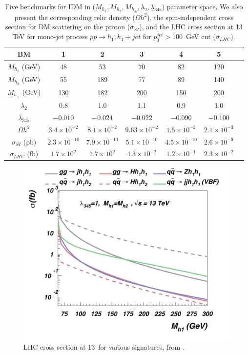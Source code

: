 \begin{table}[htb]
	\centering
	\begin{tabular}{|c||c|c|c|c|c|c|}
		\hline
		{\bf BM}                       &  {\bf 1}  & {\bf 2}  & {\bf 3}  & {\bf 4}  &  {\bf 5}  \\
		\hline\hline 
		$M_{h_{1}}$ (GeV)     & 48      	& 53 		& 70 		& 82 	&120 \\
		\hline
		$M_{h_{2}}$ (GeV)     & 55      	& 189 		& 77  		&  89  & 140 \\
		\hline
		$M_{h_{\pm}}$ (GeV)   & 130     	& 182 		& 200  	&  150  &  200 \\
		\hline
		$\lambda_{2}$         &  0.8    	& 1.0 		& 1.1 		& 0.9 	& 1.0 \\ 
		\hline
		$\lambda_{345}$       & $-0.010$ 	& $-0.024$  	& $+0.022$ 	& $-0.090$  & $-0.100$      \\
		\hline
		$\Omega h^2$          & $3.4 \times 10^{-2}$ & $8.1 \times 10^{-2}$  & $9.63 \times 10^{-2}$  & $1.5 \times 10^{-2}$  &  $2.1 \times 10^{-3}$ \\
		\hline 
		$\sigma_{SI}$ (pb)   & $2.3 \times 10^{-10}$ &  $7.9 \times 10^{-10}$  & $5.1 \times 10^{-10}$  & $4.5 \times 10^{-10}$  &  $2.6 \times 10^{-9}$ \\
		\hline 
		$\sigma_{LHC}$ (fb)     & $1.7 \times 10^{2}$ &  $7.7 \times 10^{2}$  & $4.3 \times 10^{-2}$  & $1.2 \times 10^{-1}$  &  $2.3 \times 10^{-2}$ \\
		\hline\hline
	\end{tabular}
	\caption{Five benchmarks for IDM in  ($M_{h_{1}},M_{h_{2}},M_{h_{\pm}},\lambda_{2},\lambda_{345}$) parameter space.
		We also present the corresponding relic density ($\Omega h^2$), the spin-independent cross section for DM scattering on the proton ($\sigma_{SI}$),
		and the LHC cross section at 13 TeV for mono-jet process $pp\to h_1,h_1+jet$ for $p_T^{jet}>100$~GeV cut ($\sigma_{LHC}$).}
	\label{tab:IDMbenchMarks}
\end{table}


\begin{figure}[htb]
	\includegraphics[width=\textwidth]{figures/EW/i2HDM/i2HDM_crossSections.pdf} 
	\caption{LHC cross section at 13~\tev for various signatures, from \cite{Belyaev:2015tap}.}
	\label{fig:IDM_xsecs}
\end{figure}

\clearpage